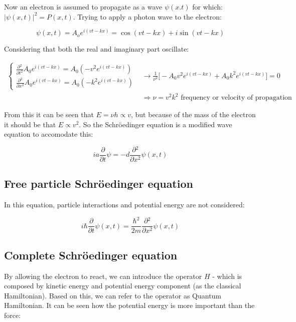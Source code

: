 Now an electron is assumed to propagate as a wave $\psi(x.t)$ for which: $|\psi(x,t)|^2 = P(x,t)$.
Trying to apply a photon wave to the electron:

$$\psi(x,t) = A_oe^{i(vt-kx)} = \cos(vt-kx) + i\sin(vt - kx)$$

Considering that both the real and imaginary part oscillate:

\begin{align*}
  \begin{cases}\frac{\partial {^2}}{\partial {t^2}}A_0e^{i(vt-kx)} = A_0(-v^2e^{i(vt-kx)})\\\frac{\partial {^2}}{\partial {x^2}}A_0e^{i(vt-kx)} = A_0(-k^2e^{i(vt-kx)})\end{cases}&\rightarrow \frac{1}{\nu^2}\biggl[-A_0v^2e^{i(vt-kx)}+A_0k^2e^{i(vt-kx)}\biggr] = 0\\
                                                                                                                                                                                  &\Rightarrow \nu = v^2k^2\text{ frequency or velocity of propagation}
\end{align*}

From this it can be seen that $E=\nu h\propto v$, but because of the mass of the electron it should be that $E\propto v^2$.
So the Schr\"oedinger equation is a modified wave equation to accomodate this:

$$ia \frac{\partial {}}{\partial {t}}\psi=-d \frac{\partial {^2}}{\partial {x^2}}\psi(x,t)$$

  \subsection{Free particle Schr\"oedinger equation}
  In this equation, particle interactions and potential energy are not considered:

  $$i\hbar \frac{\partial {}}{\partial {t}}\psi(x,t) = \frac{\hbar^2}{2m}\frac{\partial {^2}}{\partial {x^2}}\psi(x,t)$$

  \subsection{Complete Schr\"oedinger equation}
  By allowing the electron to react, we can introduce the operator $H$ - which is composed by kinetic energy and potential energy component (as the classical Hamiltonian). Based on this, we can refer to the operator as Quantum Hamiltonian.
  It can be seen how the potential energy is more important than the force:

